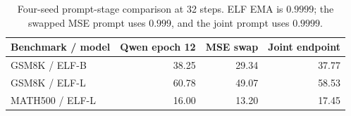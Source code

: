 \begin{table}[t]
\caption{Four-seed prompt-stage comparison at 32 steps. ELF EMA is $0.9999$; the swapped MSE prompt uses $0.999$, and the joint prompt uses $0.9999$.}
\label{tab:promptstage}
\centering\small
\begin{tabular}{lrrr}
\toprule
Benchmark / model & Qwen epoch 12 & MSE swap & Joint endpoint \\
\midrule
GSM8K / ELF-B & 38.25 & 29.34 & 37.77 \\
GSM8K / ELF-L & 60.78 & 49.07 & 58.53 \\
MATH500 / ELF-L & 16.00 & 13.20 & 17.45 \\
\bottomrule
\end{tabular}
\end{table}
